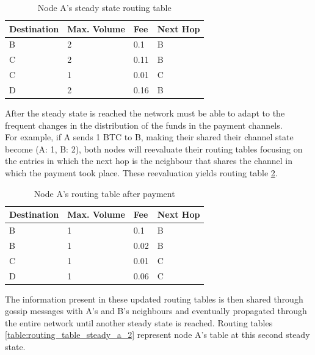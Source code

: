 \begin{table}[H]
\begin{tabular}{|l|l|l|l|}
\hline
\rowcolor[HTML]{C0C0C0} 
Destination & Max. Volume   & Fee   & Next Hop \\ \hline
B           & 2             & 0.1   & B       \\ \hline
C           & 2             & 0.11  & B       \\ \hline
C           & 1             & 0.01  & C       \\ \hline
D           & 2             & 0.16  & B       \\ \hline
\end{tabular}
\caption{Node A's steady state routing table}
\label{table:routing_table_steady_a}
\end{table}

After the steady state is reached the network must be able to adapt to the frequent changes in the distribution of the funds in the payment channels.\\
For example, if A sends 1 BTC to B, making their shared their channel state become (A: 1, B: 2), both nodes will reevaluate their routing tables focusing on the entries in which the next hop is the neighbour that shares the channel in which the payment took place. These reevaluation yields routing table \ref{table:routing_table_payment_a}.

\begin{table}[H]
\begin{tabular}{|l|l|l|l|}
\hline
\rowcolor[HTML]{C0C0C0} 
Destination & Max. Volume   & Fee   & Next Hop \\ \hline
B           & 1             & 0.1   & B       \\ \hline
B           & 1             & 0.02  & B         \\ \hline
C           & 1             & 0.01  & C       \\ \hline
D           & 1             & 0.06  & C       \\ \hline
\end{tabular}
\caption{Node A's routing table after payment}
\label{table:routing_table_payment_a}
\end{table}

The information present in these updated routing tables is then shared through gossip messages with A's and B's neighbours and eventually propagated through the entire network until another steady state is reached. Routing tables \ref{table:routing_table_steady_a_2} represent node A's table at this second steady state.

